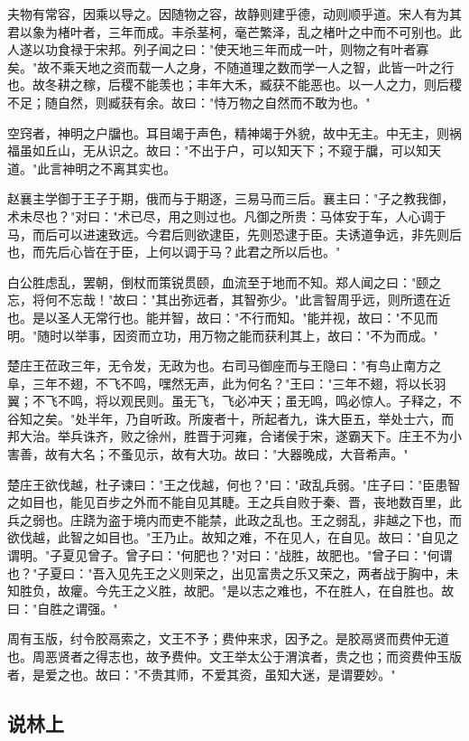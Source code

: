 \documentclass[]{article}
\begin{document}
夫物有常容，因乘以导之。因随物之容，故静则建乎德，动则顺乎道。宋人有为其君以象为楮叶者，三年而成。丰杀茎柯，毫芒繁泽，乱之楮叶之中而不可别也。此人遂以功食禄于宋邦。列子闻之曰："使天地三年而成一叶，则物之有叶者寡矣。"故不乘天地之资而载一人之身，不随道理之数而学一人之智，此皆一叶之行也。故冬耕之稼，后稷不能羡也；丰年大禾，臧获不能恶也。以一人之力，则后稷不足；随自然，则臧获有余。故曰："恃万物之自然而不敢为也。"

空窍者，神明之户牖也。耳目竭于声色，精神竭于外貌，故中无主。中无主，则祸福虽如丘山，无从识之。故曰："不出于户，可以知天下；不窥于牖，可以知天道。"此言神明之不离其实也。

赵襄主学御于王子于期，俄而与于期逐，三易马而三后。襄主曰："子之教我御，术未尽也？"对曰："术已尽，用之则过也。凡御之所贵：马体安于车，人心调于马，而后可以进速致远。今君后则欲逮臣，先则恐逮于臣。夫诱道争远，非先则后也，而先后心皆在于臣，上何以调于马？此君之所以后也。"

白公胜虑乱，罢朝，倒杖而策锐贯颐，血流至于地而不知。郑人闻之曰："颐之忘，将何不忘哉！"故曰："其出弥远者，其智弥少。"此言智周乎远，则所遗在近也。是以圣人无常行也。能并智，故曰："不行而知。"能并视，故曰："不见而明。"随时以举事，因资而立功，用万物之能而获利其上，故曰："不为而成。"

楚庄王莅政三年，无令发，无政为也。右司马御座而与王隐曰："有鸟止南方之阜，三年不翅，不飞不鸣，嘿然无声，此为何名？"王曰："三年不翅，将以长羽翼；不飞不鸣，将以观民则。虽无飞，飞必冲天；虽无鸣，鸣必惊人。子释之，不谷知之矣。"处半年，乃自听政。所废者十，所起者九，诛大臣五，举处士六，而邦大治。举兵诛齐，败之徐州，胜晋于河雍，合诸侯于宋，遂霸天下。庄王不为小害善，故有大名；不蚤见示，故有大功。故曰："大器晚成，大音希声。"

楚庄王欲伐越，杜子谏曰："王之伐越，何也？"曰："政乱兵弱。"庄子曰："臣患智之如目也，能见百步之外而不能自见其睫。王之兵自败于秦、晋，丧地数百里，此兵之弱也。庄跷为盗于境内而吏不能禁，此政之乱也。王之弱乱，非越之下也，而欲伐越，此智之如目也。"王乃止。故知之难，不在见人，在自见。故曰："自见之谓明。"子夏见曾子。曾子曰："何肥也？"对曰："战胜，故肥也。"曾子曰："何谓也？"子夏曰："吾入见先王之义则荣之，出见富贵之乐又荣之，两者战于胸中，未知胜负，故癯。今先王之义胜，故肥。"是以志之难也，不在胜人，在自胜也。故曰："自胜之谓强。"

周有玉版，纣令胶鬲索之，文王不予；费仲来求，因予之。是胶鬲贤而费仲无道也。周恶贤者之得志也，故予费仲。文王举太公于渭滨者，贵之也；而资费仲玉版者，是爱之也。故曰："不贵其师，不爱其资，虽知大迷，是谓要妙。"

\hypertarget{header-n993}{%
\subsection{说林上}\label{header-n993}}
\end{document}
